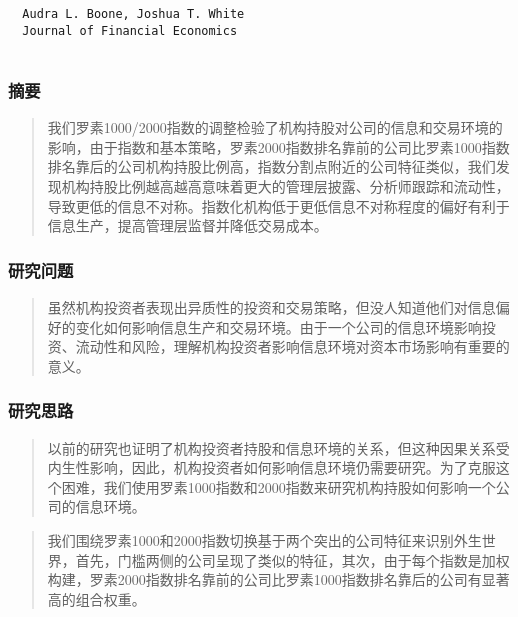 \documentclass[
]{article}
\begin{document}
\begin{verbatim}
  Audra L. Boone, Joshua T. White
  Journal of Financial Economics
  
\end{verbatim}

\hypertarget{ux6458ux8981-6}{%
\subsubsection{摘要}\label{ux6458ux8981-6}}

\begin{quote}
我们罗素1000/2000指数的调整检验了机构持股对公司的信息和交易环境的影响，由于指数和基本策略，罗素2000指数排名靠前的公司比罗素1000指数排名靠后的公司机构持股比例高，指数分割点附近的公司特征类似，我们发现机构持股比例越高越高意味着更大的管理层披露、分析师跟踪和流动性，导致更低的信息不对称。指数化机构低于更低信息不对称程度的偏好有利于信息生产，提高管理层监督并降低交易成本。
\end{quote}

\hypertarget{ux7814ux7a76ux95eeux9898-6}{%
\subsubsection{研究问题}\label{ux7814ux7a76ux95eeux9898-6}}

\begin{quote}
虽然机构投资者表现出异质性的投资和交易策略，但没人知道他们对信息偏好的变化如何影响信息生产和交易环境。由于一个公司的信息环境影响投资、流动性和风险，理解机构投资者影响信息环境对资本市场影响有重要的意义。
\end{quote}

\hypertarget{ux7814ux7a76ux601dux8def-3}{%
\subsubsection{研究思路}\label{ux7814ux7a76ux601dux8def-3}}

\begin{quote}
以前的研究也证明了机构投资者持股和信息环境的关系，但这种因果关系受内生性影响，因此，机构投资者如何影响信息环境仍需要研究。为了克服这个困难，我们使用罗素1000指数和2000指数来研究机构持股如何影响一个公司的信息环境。
\end{quote}

\begin{quote}
我们围绕罗素1000和2000指数切换基于两个突出的公司特征来识别外生世界，首先，门槛两侧的公司呈现了类似的特征，其次，由于每个指数是加权构建，罗素2000指数排名靠前的公司比罗素1000指数排名靠后的公司有显著高的组合权重。
\end{quote}
\end{document}
